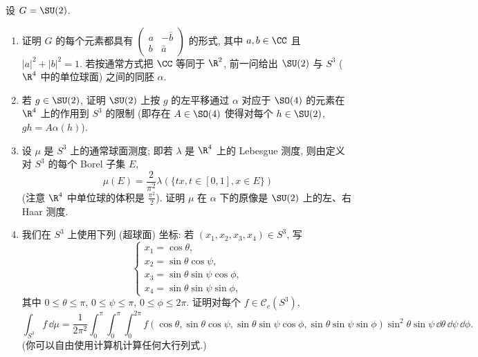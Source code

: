 \begin{exercise}[$\SU(2)$ 上的 Haar 测度]
\label{ex:I.5.3.10}
设 $G = \SU(2)$.
\begin{enumerate}
\item[(a)] 证明 $G$ 的每个元素都具有 $\begin{pmatrix} a & -\bar{b} \\ b & \bar{a} \end{pmatrix}$ 的形式, 其中 $a, b \in \CC$ 且 $|a|^2 + |b|^2 = 1$.
若按通常方式把 $\CC$ 等同于 $\R^2$, 前一问给出 $\SU(2)$ 与 $S^3$ ($\R^4$ 中的单位球面) 之间的同胚 $\alpha$.
\item[(a)] 若 $g \in \SU(2)$, 证明 $\SU(2)$ 上按 $g$ 的左平移通过 $\alpha$ 对应于 $\SO(4)$ 的元素在 $\R^4$ 上的作用到 $S^3$ 的限制 (即存在 $A \in \SO(4)$ 使得对每个 $h \in \SU(2)$, $gh = A\alpha(h)$).
\item[(b)] 设 $\mu$ 是 $S^3$ 上的通常球面测度; 即若 $\lambda$ 是 $\R^4$ 上的 Lebesgue 测度, 则由定义对 $S^3$ 的每个 Borel 子集 $E$,
\[
\mu(E) = \frac{2}{\pi^2}\lambda(\{tx, t \in [0,1], x \in E\})
\]
(注意 $\R^4$ 中单位球的体积是 $\frac{\pi^2}{2}$). 证明 $\mu$ 在 $\alpha$ 下的原像是 $\SU(2)$ 上的左、右 Haar 测度.
\item[(c)] 我们在 $S^3$ 上使用下列 (超球面) 坐标: 若 $(x_1, x_2, x_3, x_4) \in S^3$, 写
\[
\begin{cases} x_1 = \cos\theta, \\ x_2 = \sin\theta\cos\psi, \\ x_3 = \sin\theta\sin\psi\cos\phi, \\ x_4 = \sin\theta\sin\psi\sin\phi, \end{cases}
\]
其中 $0 \leq \theta \leq \pi$, $0 \leq \psi \leq \pi$, $0 \leq \phi \leq 2\pi$. 证明对每个 $f \in \mathcal{C}_c(S^3)$,
\[
\int_{S^3}f\,\dd\mu = \frac{1}{2\pi^2}\int_0^{\pi}\int_0^{\pi}\int_0^{2\pi}f(\cos\theta, \sin\theta\cos\psi, \sin\theta\sin\psi\cos\phi, \sin\theta\sin\psi\sin\phi)\sin^2\theta\sin\psi\,\dd\theta\,\dd\psi\,\dd\phi.
\]
(你可以自由使用计算机计算任何大行列式.)
\end{enumerate}
\end{exercise}

